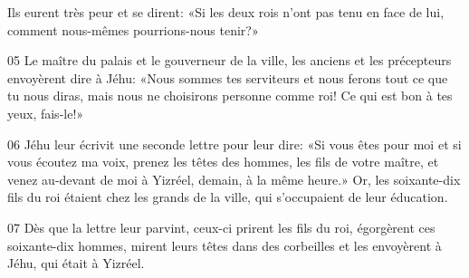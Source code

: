 Ils eurent très peur et se dirent: «Si les deux rois n’ont pas tenu en face de lui, comment nous-mêmes pourrions-nous tenir?»

05 Le maître du palais et le gouverneur de la ville, les anciens et les précepteurs envoyèrent dire à Jéhu: «Nous sommes tes serviteurs et nous ferons tout ce que tu nous diras, mais nous ne choisirons personne comme roi! Ce qui est bon à tes yeux, fais-le!»

06 Jéhu leur écrivit une seconde lettre pour leur dire: «Si vous êtes pour moi et si vous écoutez ma voix, prenez les têtes des hommes, les fils de votre maître, et venez au-devant de moi à Yizréel, demain, à la même heure.» Or, les soixante-dix fils du roi étaient chez les grands de la ville, qui s’occupaient de leur éducation.

07  Dès que la lettre leur parvint, ceux-ci prirent les fils du roi, égorgèrent ces soixante-dix hommes, mirent leurs têtes dans des corbeilles et les envoyèrent à Jéhu, qui était à Yizréel.